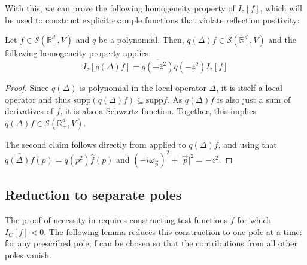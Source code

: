 \documentclass[10pt,a4paper,oneside,reqno]{amsart}
\newcommand{\reals}{\mathbb{R}}
\begin{document}
With this, we can prove the following homogeneity property of $I_z[f]$, which will be used to construct explicit example functions that violate reflection positivity:
\begin{lemma}\label{Homogeneity Lemma} Let $f \in \mathcal{S}(\reals^d_+, V)$ and $q$ be a polynomial. Then, $q(\Delta)f \in \mathcal{S}(\mathbb{R}^d_+, V)$ and the following homogeneity property applies:
\begin{equation}\label{Homogeneity Lemma Equation}
    I_z [q(\Delta)f] = \overline{q(-\bar{z}^2)}q(-z^2) I_z
    [f]
\end{equation}
\end{lemma}
\begin{proof} Since $q(\Delta)$ is polynomial in the local operator $\Delta$, it is itself a local operator and thus $\mathrm{supp}(q(\Delta) f) \subseteq \mathrm{supp} f$. As $q(\Delta) f$ is also just a sum of derivatives of $f$, it is also a Schwartz function. Together, this implies $q(\Delta) f \in \mathcal{S}(\reals^d_+, V)$.

The second claim follows directly from  applied to $q(\Delta)f$, and using that $\widehat{q(\Delta)f}(p)=q(p^2)\hat f(p)$ and $(-i\omega_{\vec p})^2 +\lvert\vec p\rvert^2 = -z^2$.

\end{proof}
\subsection{Reduction to separate poles}
The proof of necessity in  requires constructing test functions $f$ for which $I_C[f] < 0$. The following lemma reduces this construction to one pole at a time: for any prescribed pole, f can be chosen so that the contributions from all other poles vanish.
\end{document}
